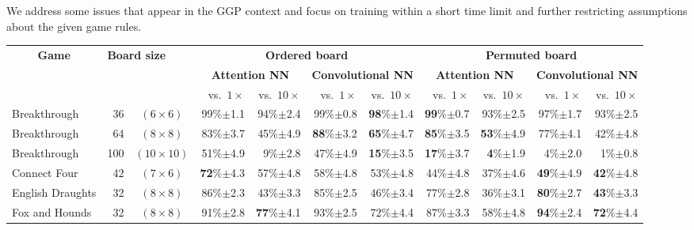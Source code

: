 \documentclass[letterpaper]{article} %
\begin{document}
We address some issues that appear in the GGP context and focus on training within a short time limit and further restricting assumptions about the given game rules.


\begin{table}[!ht]\small\renewcommand{\arraystretch}{1.045}
\newcommand{\cb}[1]{{\scriptsize $\pm$#1}}
\newcommand{\oppA}{vs.\ $1\times$}
\newcommand{\oppB}{vs.\ $10\times$}
\begin{center}\begin{tabular}{|lrc|r|r|r|r|r|r|r|r|}\hline
\multicolumn{1}{|c}{\multirow{3}{*}{{\bf Game}}} & \multicolumn{2}{l|}{\multirow{3}{*}{\bf Board size}} & \multicolumn{4}{c|}{\bf Ordered board} & \multicolumn{4}{c|}{\bf Permuted board} \\\cline{4-11}
& & & \multicolumn{2}{c|}{{\bf Attention NN}} & \multicolumn{2}{c|}{{\bf Convolutional NN}} & \multicolumn{2}{c|}{{\bf Attention NN}} & \multicolumn{2}{c|}{{\bf Convolutional NN}} \\%
\multicolumn{3}{|c|}{} & \oppA & \oppB & \oppA & \oppB & \oppA & \oppB & \oppA & \oppB \\\hline

Breakthrough & 36 & $(6\times6)$  & {99}\%\cb{1.1} & 94\%\cb{2.4} & {99}\%\cb{0.8} & \textbf{98}\%\cb{1.4} & \textbf{99}\%\cb{0.7} & {93}\%\cb{2.5}  & 97\%\cb{1.7} & {93}\%\cb{2.5} \\ %
Breakthrough & 64 & $ (8\times8)$ & 83\%\cb{3.7} & 45\%\cb{4.9} & \textbf{88}\%\cb{3.2} & \textbf{65}\%\cb{4.7} & \textbf{85}\%\cb{3.5} & \textbf{53}\%\cb{4.9} & 77\%\cb{4.1} & 42\%\cb{4.8} \\ %
Breakthrough & 100 & $(10\times10)$ & {51}\%\cb{4.9} & 9\%\cb{2.8} & {47}\%\cb{4.9} & \textbf{15}\%\cb{3.5} & \textbf{17}\%\cb{3.7} & \textbf{4}\%\cb{1.9} & 4\%\cb{2.0} & 1\%\cb{0.8} \\

\multirow{1}{*}{Connect Four} & 42 & $(7\times6)$  & \textbf{72}\%\cb{4.3} & {57}\%\cb{4.8} & 58\%\cb{4.8} & {53}\%\cb{4.8} & 44\%\cb{4.8} & 37\%\cb{4.6}  & \textbf{49}\%\cb{4.9} & \textbf{42}\%\cb{4.8} \\

\multirow{1}{*}{English Draughts} & 32 & $(8\times8)$  & {86}\%\cb{2.3} & {43}\%\cb{3.3} & {85}\%\cb{2.5} & {46}\%\cb{3.4} & 77\%\cb{2.8} & 36\%\cb{3.1}  & \textbf{80}\%\cb{2.7} & \textbf{43}\%\cb{3.3} \\

\multirow{1}{*}{Fox and Hounds} & 32 & $(8\times8)$  & {91}\%\cb{2.8} & \textbf{77}\%\cb{4.1} & {93}\%\cb{2.5} & 72\%\cb{4.4} & 87\%\cb{3.3} & 58\%\cb{4.8}  & \textbf{94}\%\cb{2.4} & \textbf{72}\%\cb{4.4} \\


\end{tabular}
\end{center}
\end{table}
\end{document}
